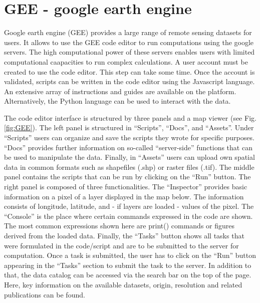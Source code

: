 \documentclass[
  10pt,
  b5paper,
  oneside]{book}
\begin{document}
\hypertarget{gee---google-earth-engine}{%
\section{GEE - google earth engine}\label{gee---google-earth-engine}}

Google earth engine (GEE) provides a large range of remote sensing datasets for users. It allows to use the GEE code editor to run computations using the google servers. The high computational power of these servers enables users with limited computational caapacities to run complex calculations.
A user account must be created to use the code editor. This step can take some time. Once the account is validated, scripts can be written in the code editor using the Javascript language. An extensive array of instructions and guides are available on the platform. Alternatively, the Python language can be used to interact with the data.

The code editor interface is structured by three panels and a map viewer (see Fig. \ref{fig:GEE}). The left panel is structured in ``Scripts'', ``Docs'', and ``Assets''. Under ``Scripts'' users can organize and save the scripts they wrote for specific purposes. ``Docs'' provides further information on so-called ``server-side'' functions that can be used to manipulate the data. Finally, in ``Assets'' users can upload own spatial data in common formats such as shapefiles (.shp) or raster files (.tif).
The middle panel contains the scripts that can be run by clicking on the ``Run'' button.
The right panel is composed of three functionalities. The ``Inspector'' provides basic information on a pixel of a layer displayed in the map below. The information consists of longitude, latitude, and - if layers are loaded - values of the pixel. The ``Console'' is the place where certain commands expressed in the code are shown. The most common expressions shown here are print() commands or figures derived from the loaded data. Finally, the ``Tasks'' button shows all tasks that were formulated in the code/script and are to be submitted to the server for computation. Once a task is submitted, the user has to click on the ``Run'' button appearing in the ``Tasks'' section to submit the task to the server.
In addition to that, the data catalog can be accessed via the search bar on the top of the page. Here, key information on the available datasets, origin, resolution and related publications can be found.
\end{document}
